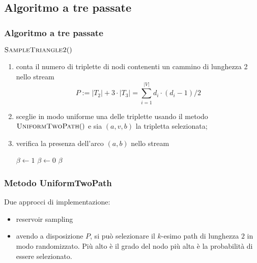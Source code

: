 \documentclass{beamer}
\begin{document}
\subsection{Algoritmo a tre passate}

\begin{frame}
\frametitle{Algoritmo a tre passate}

$\Call{SampleTriangle2}{ }$
\begin{enumerate}
    \item conta il numero di triplette di nodi contenenti un cammino di lunghezza 2 nello stream
\[
    P:=\left|T_{2}\right|+3 \cdot\left|T_{3}\right|=\sum_{i=1}^{|V|} d_{i} \cdot\left(d_{i}-1\right) / 2
\]
    \item sceglie in modo uniforme una delle triplette
        usando il metodo
        $\Call{UniformTwoPath}{ }$
        e sia $(a, v, b)$ la tripletta selezionata;
    \item 
        verifica la presenza dell'arco $(a,b)$ nello stream
        \begin{algorithmic}
                \State $\beta \gets 1$
            \Else
                \State $\beta \gets 0$
            \EndIf
            \Return $\beta$
        \end{algorithmic}
\end{enumerate}

\end{frame}

\begin{frame}
\frametitle{Metodo UniformTwoPath}

Due approcci di implementazione:
\begin{itemize}
    \item reservoir sampling
    \item avendo a disposizione $P$, si può selezionare il $k$-esimo path di lunghezza $2$ in modo randomizzato. Più alto è il grado del nodo più alta è la probabilità di essere selezionato.
\end{itemize}

\end{frame}
\end{document}
